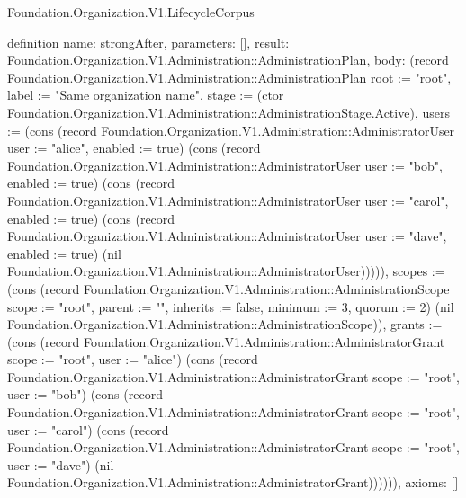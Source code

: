 \begin{lexlean}{Foundation.Organization.V1.LifecycleCorpus}
\begin{semanticmodule}
definition{
  name: strongAfter,
  parameters: [],
  result: Foundation.Organization.V1.Administration::AdministrationPlan,
  body: (record Foundation.Organization.V1.Administration::AdministrationPlan {root := "root", label := "Same organization name", stage := (ctor Foundation.Organization.V1.Administration::AdministrationStage.Active), users := (cons (record Foundation.Organization.V1.Administration::AdministratorUser {user := "alice", enabled := true}) (cons (record Foundation.Organization.V1.Administration::AdministratorUser {user := "bob", enabled := true}) (cons (record Foundation.Organization.V1.Administration::AdministratorUser {user := "carol", enabled := true}) (cons (record Foundation.Organization.V1.Administration::AdministratorUser {user := "dave", enabled := true}) (nil Foundation.Organization.V1.Administration::AdministratorUser))))), scopes := (cons (record Foundation.Organization.V1.Administration::AdministrationScope {scope := "root", parent := "", inherits := false, minimum := 3, quorum := 2}) (nil Foundation.Organization.V1.Administration::AdministrationScope)), grants := (cons (record Foundation.Organization.V1.Administration::AdministratorGrant {scope := "root", user := "alice"}) (cons (record Foundation.Organization.V1.Administration::AdministratorGrant {scope := "root", user := "bob"}) (cons (record Foundation.Organization.V1.Administration::AdministratorGrant {scope := "root", user := "carol"}) (cons (record Foundation.Organization.V1.Administration::AdministratorGrant {scope := "root", user := "dave"}) (nil Foundation.Organization.V1.Administration::AdministratorGrant)))))}),
  axioms: []
}


\end{semanticmodule}
\end{lexlean}
